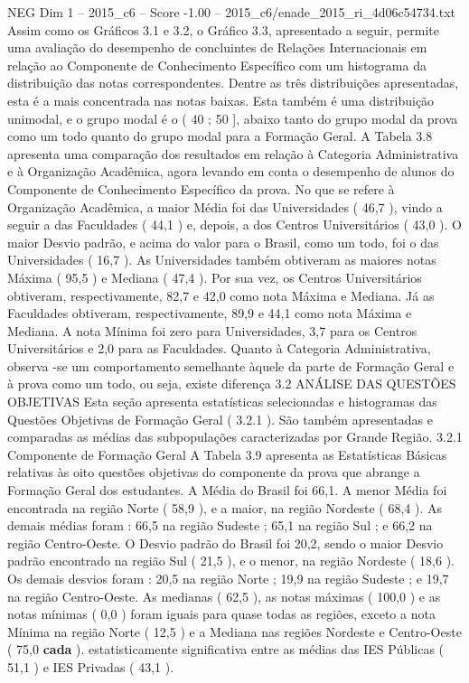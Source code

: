 \begin{textsample}{NEG Dim 1 – 2015\_c6 – Score -1.00 – 2015\_c6/enade\_2015\_ri\_4d06c54734.txt}
Assim como os Gráficos 3.1 e 3.2, o Gráfico 3.3, apresentado a seguir, permite uma avaliação do desempenho de concluintes de Relações Internacionais em relação ao Componente de Conhecimento Específico com um histograma da distribuição das notas correspondentes.
Dentre as três distribuições apresentadas, esta é a mais concentrada nas notas baixas.
Esta também é uma distribuição unimodal, e o grupo modal é o ( 40 ; 50 ], abaixo tanto do grupo modal da prova como um todo quanto do grupo modal para a Formação Geral.
A Tabela 3.8 apresenta uma comparação dos resultados em relação à Categoria Administrativa e à Organização Acadêmica, agora levando em conta o desempenho de alunos do Componente de Conhecimento Específico da prova.
No que se refere à Organização Acadêmica, a maior Média foi das Universidades ( 46,7 ), vindo a seguir a das Faculdades ( 44,1 ) e, depois, a dos Centros Universitários ( 43,0 ).
O maior Desvio padrão, e acima do valor para o Brasil, como um todo, foi o das Universidades ( 16,7 ).
As Universidades também obtiveram as maiores notas Máxima ( 95,5 ) e Mediana ( 47,4 ).
Por sua vez, os Centros Universitários obtiveram, respectivamente, 82,7 e 42,0 como nota Máxima e Mediana.
Já as Faculdades obtiveram, respectivamente, 89,9 e 44,1 como nota Máxima e Mediana.
A nota Mínima foi zero para Universidades, 3,7 para os Centros Universitários e 2,0 para as Faculdades.
Quanto à Categoria Administrativa, observa -se um comportamento semelhante àquele da parte de Formação Geral e à prova como um todo, ou seja, existe diferença 3.2 ANÁLISE DAS QUESTÕES OBJETIVAS Esta seção apresenta estatísticas selecionadas e histogramas das Questões Objetivas de Formação Geral ( 3.2.1 ).
São também apresentadas e comparadas as médias das subpopulações caracterizadas por Grande Região. 3.2.1 Componente de Formação Geral A Tabela 3.9 apresenta as Estatísticas Básicas relativas às oito questões objetivas do componente da prova que abrange a Formação Geral dos estudantes.
A Média do Brasil foi 66,1.
A menor Média foi encontrada na região Norte ( 58,9 ), e a maior, na região Nordeste ( 68,4 ).
As demais médias foram : 66,5 na região Sudeste ; 65,1 na região Sul ; e 66,2 na região Centro-Oeste.
O Desvio padrão do Brasil foi 20,2, sendo o maior Desvio padrão encontrado na região Sul ( 21,5 ), e o menor, na região Nordeste ( 18,6 ).
Os demais desvios foram : 20,5 na região Norte ; 19,9 na região Sudeste ; e 19,7 na região Centro-Oeste.
As medianas ( 62,5 ), as notas máximas ( 100,0 ) e as notas mínimas ( 0,0 ) foram iguais para quase todas as regiões, exceto a nota Mínima na região Norte ( 12,5 ) e a Mediana nas regiões Nordeste e Centro-Oeste ( 75,0 \textbf{cada} ). estatisticamente significativa entre as médias das IES Públicas ( 51,1 ) e IES Privadas ( 43,1 ).

\end{textsample}
